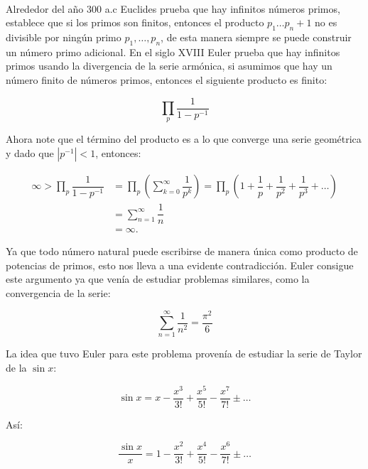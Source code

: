 
\thispagestyle{empty}
\vspace{-0.5cm}

\\

Alrededor del año 300 a.c Euclides prueba que hay infinitos números primos, establece que si los primos son finitos, entonces el producto $p_1\ldots p_n+1$ no es divisible por ningún primo $p_1,\ldots,p_n$, de esta manera siempre se puede construir un número primo adicional. En el siglo XVIII Euler prueba que hay infinitos primos usando la divergencia de la serie armónica, si asumimos que hay un número finito de números primos, entonces el siguiente producto es finito:

$$\prod_p \dfrac{1}{1-p^{-1}}$$

Ahora note que el término del producto es a lo que converge una serie geométrica y dado que $|p^{-1}|<1$, entonces:

\begin{align*}
    \infty>\prod_p \dfrac{1}{1-p^{-1}}&=\prod_p \left(\sum_{k=0}^{\infty}\dfrac{1}{p^k}\right)=\prod_p \left(1+\dfrac{1}{p}+\dfrac{1}{p^2}+\dfrac{1}{p^3}+\ldots\right)\\
    &=\sum_{n=1}^{\infty}\dfrac{1}{n}\\
    &=\infty
.\end{align*}

Ya que todo número natural puede escribirse de manera única como producto de potencias de primos, esto nos lleva a una evidente contradicción. Euler consigue este argumento ya que venía de estudiar problemas similares, como la convergencia de la serie:

$$\sum_{n=1}^{\infty}\frac{1}{n^2}=\frac{\pi^2}{6}$$

La idea que tuvo Euler para este problema provenía de estudiar la serie de Taylor de la $\sin x$:

$$\sin x=x-\frac{x^3}{3!}+\frac{x^5}{5!}-\frac{x^7}{7!}\pm \ldots$$

Así:

$$\frac{\sin x}{x}=1-\frac{x^2}{3!}+\frac{x^4}{5!}-\frac{x^6}{7!}\pm\ldots$$

